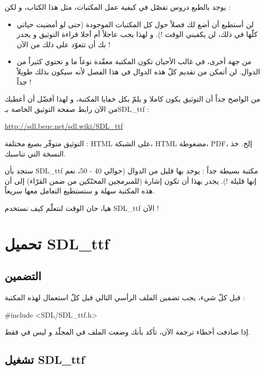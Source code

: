 يوجد بالطبع دروس تفصّل في كيفية عمل المكتبات، مثل هذا الكتاب، و لكن :

\begin{itemize}
	\item لن أستطيع أن أضع لك فصلاً حول كل المكتبات الموجودة (حتى لو أمضيت حياتي كلّها في ذلك، لن يكفيني الوقت !). و لهذا يجب عاجلاً أم آجلا قراءة التوثيق و يجدر بك أن تتعوّد على ذلك من الآن !
	\item من جهة أخرى، في غالب الأحيان تكون المكتبة معقّدة نوعاً ما و تحتوي كثيراً من الدوال. لن أتمكن من تقديم كلّ هذه الدوال في هذا الفصل لأنه سيكون بذلك طويلاً جداً !
\end{itemize}

من الواضح جداً أن التوثيق يكون كاملا و يلمّ بكل خفايا المكتبة، و لهذا أفضّل أن أعطيك من الآن رابط صفحة التوثيق الخاصة بـ\textenglish{SDL\_ttf} :

\url{http://sdl.beuc.net/sdl.wiki/SDL_ttf}

التوثيق متوفّر بصيغ مختلفة : 
\textenglish{HTML}
على الشبكة، 
\textenglish{HTML}
مضغوطة،
\textenglish{PDF}،
إلخ. خذ النسخة التي تناسبك.

ستجد بأن
\textenglish{SDL\_ttf}
مكتبة بسيطة جداً : يوجد بها قليل من الدوال (حوالي 40 - 50، نعم إنها قليلة !). يجدر بهذا أن تكون إشارة (للمبرمجين المحنّكين من ضمن القرّاء) إلى أن هذه المكتبة سهلة و ستستطيع التعامل معها سريعاً.

هيا، حان الوقت لنتعلّم كيف نستخدم
\textenglish{SDL\_ttf}
الآن !

\section{تحميل \textenglish{SDL\_ttf}}

\subsection{التضمين}

قبل كلّ شيء، يجب تضمين الملف الرأسي التالي قبل كلّ استعمال لهذه المكتبة :

\begin{Csource}
#include <SDL/SDL_ttf.h>
\end{Csource}

إذا صادفت أخطاء ترجمة الآن، تأكد بأنك وضعت الملف
في المجلّد
و ليس في 
فقط.

\subsection{تشغيل \textenglish{SDL\_ttf}}

